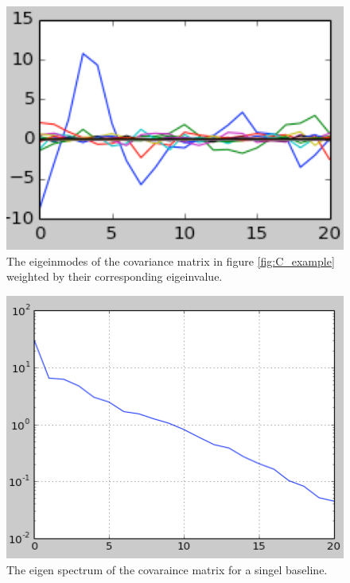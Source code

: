 \documentclass[twocolumn,numberedappendix]{emulateapj}
\begin{document}
\begin{figure}[h!]\centering
\includegraphics[width=\columnwidth, height=.8\columnwidth]{plots/lamV_example.png}
\caption{The eigeinmodes of the covariance matrix in figure \ref{fig:C_example}
weighted by their corresponding eigeinvalue.} 
\label{fig:lamV_example}
\end{figure}

\begin{figure}[h!]\centering
\includegraphics[width=\columnwidth, height=.8\columnwidth]{plots/lam_example.png}
\caption{The eigen spectrum of the covaraince matrix for a singel baseline.}
\label{fig:lam_example}
\end{figure}
\end{document}
